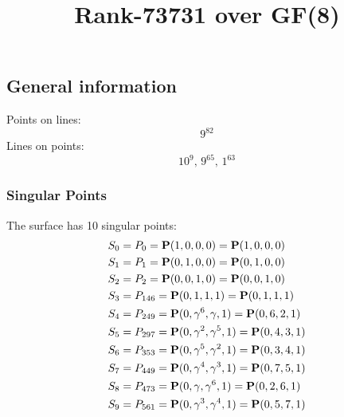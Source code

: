 \documentclass{article}
\newcommand\setTBstruts{\def\T{\rule{0pt}{2.6ex}}%
\def\B{\rule[-1.2ex]{0pt}{0pt}}}
\newcommand{\bP}{{\bf P}}
\begin{document}
 
\setTBstruts



{\allowdisplaybreaks%






\title{Rank-73731 over GF(8)}
\author{}%
\maketitle%
%
{}



\subsection*{General information}
Points on lines:
$$
9^{82}$$
Lines on points:
$$
10^9,\,9^{65},\,1^{63}$$
\subsubsection*{Singular Points}
The surface has 10 singular points:\\
\begin{align*}
S_{0} &= P_{0}=\bP(1, 0, 0, 0) = \bP(1, 0, 0, 0)\\
S_{1} &= P_{1}=\bP(0, 1, 0, 0) = \bP(0, 1, 0, 0)\\
S_{2} &= P_{2}=\bP(0, 0, 1, 0) = \bP(0, 0, 1, 0)\\
S_{3} &= P_{146}=\bP(0, 1, 1, 1) = \bP(0, 1, 1, 1)\\
S_{4} &= P_{249}=\bP(0, \gamma^{6}, \gamma , 1) = \bP(0, 6, 2, 1)\\
S_{5} &= P_{297}=\bP(0, \gamma^{2}, \gamma^{5}, 1) = \bP(0, 4, 3, 1)\\
S_{6} &= P_{353}=\bP(0, \gamma^{5}, \gamma^{2}, 1) = \bP(0, 3, 4, 1)\\
S_{7} &= P_{449}=\bP(0, \gamma^{4}, \gamma^{3}, 1) = \bP(0, 7, 5, 1)\\
S_{8} &= P_{473}=\bP(0, \gamma , \gamma^{6}, 1) = \bP(0, 2, 6, 1)\\
S_{9} &= P_{561}=\bP(0, \gamma^{3}, \gamma^{4}, 1) = \bP(0, 5, 7, 1)\\
\end{align*}
}
\end{document}

